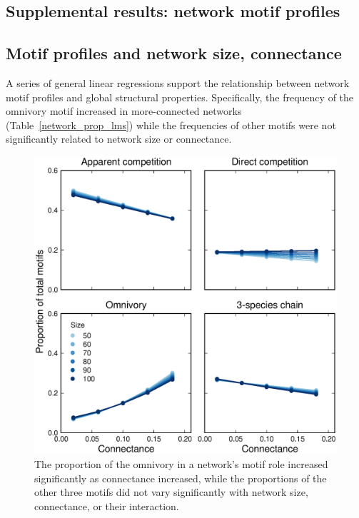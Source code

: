 \documentclass[12pt]{article}
\begin{document}
\begin{spacing}{2.0}
\clearpage

                

\section{Supplemental results: network motif profiles}


    \subsection{Motif profiles and network size, connectance}
    
        A series of general linear regressions support the relationship between network motif profiles and global structural properties.
        Specifically, the frequency of the omnivory motif increased in more-connected networks (Table~\ref{network_prop_lms}) while the frequencies of other motifs were not significantly related to network size or connectance.
    
    \begin{figure}[hb!]
        \centering
        \includegraphics[width=\textwidth]{figures/motif_proportion_lms.eps}
        \caption{The proportion of the omnivory in a network's motif role increased significantly as connectance increased, while the proportions of the other three motifs did not vary significantly with network size, connectance, or their interaction.}
        \label{motif_proportion_lms}
    \end{figure}    
    

\end{spacing}
\end{document}
